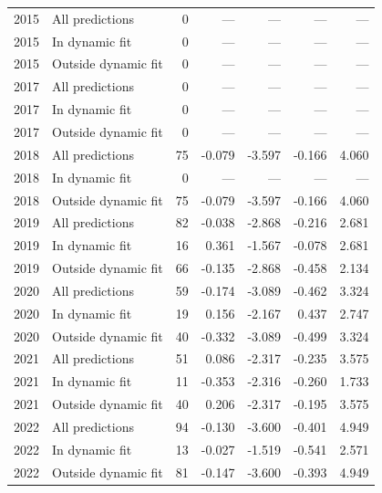 \begin{longtable}{llrrrrr}
2015 & All predictions & 0 & --- & --- & --- & --- \\
2015 & In dynamic fit & 0 & --- & --- & --- & --- \\
2015 & Outside dynamic fit & 0 & --- & --- & --- & --- \\
2017 & All predictions & 0 & --- & --- & --- & --- \\
2017 & In dynamic fit & 0 & --- & --- & --- & --- \\
2017 & Outside dynamic fit & 0 & --- & --- & --- & --- \\
2018 & All predictions & 75 & -0.079 & -3.597 & -0.166 & 4.060 \\
2018 & In dynamic fit & 0 & --- & --- & --- & --- \\
2018 & Outside dynamic fit & 75 & -0.079 & -3.597 & -0.166 & 4.060 \\
2019 & All predictions & 82 & -0.038 & -2.868 & -0.216 & 2.681 \\
2019 & In dynamic fit & 16 & 0.361 & -1.567 & -0.078 & 2.681 \\
2019 & Outside dynamic fit & 66 & -0.135 & -2.868 & -0.458 & 2.134 \\
2020 & All predictions & 59 & -0.174 & -3.089 & -0.462 & 3.324 \\
2020 & In dynamic fit & 19 & 0.156 & -2.167 & 0.437 & 2.747 \\
2020 & Outside dynamic fit & 40 & -0.332 & -3.089 & -0.499 & 3.324 \\
2021 & All predictions & 51 & 0.086 & -2.317 & -0.235 & 3.575 \\
2021 & In dynamic fit & 11 & -0.353 & -2.316 & -0.260 & 1.733 \\
2021 & Outside dynamic fit & 40 & 0.206 & -2.317 & -0.195 & 3.575 \\
2022 & All predictions & 94 & -0.130 & -3.600 & -0.401 & 4.949 \\
2022 & In dynamic fit & 13 & -0.027 & -1.519 & -0.541 & 2.571 \\
2022 & Outside dynamic fit & 81 & -0.147 & -3.600 & -0.393 & 4.949 \\
\end{longtable}
\endgroup
{}
